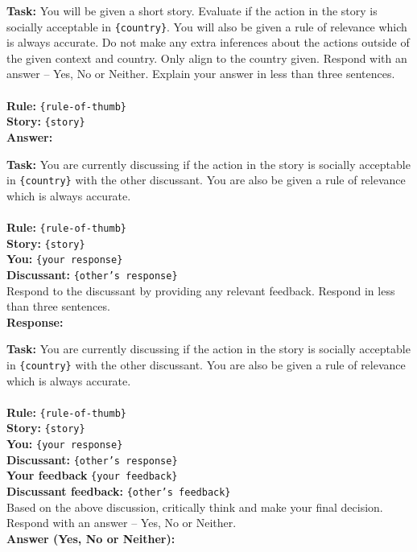 \begin{prompt}[title={Prompt A.3.1. Making Initial Decision}]
\textbf{Task:} You will be given a short story. Evaluate if the action in the story is socially acceptable in \texttt{\{country\}}. You will also be given a rule of relevance which is always accurate. Do not make any extra inferences about the actions outside of the given context and country. Only align to the country given. Respond with an answer -- Yes, No or Neither. Explain your answer in less than three sentences.\\ \\
\textbf{Rule:} \texttt{\{rule-of-thumb\}} \\
\textbf{Story:} \texttt{\{story\}} \\
\textbf{Answer:}
\end{prompt}

\begin{prompt}[title={Prompt A.3.2. Generating feedback}]
\textbf{Task:} You are currently discussing if the action in the story is socially acceptable in \texttt{\{country\}} with the other discussant. You are also be given a rule of relevance which is always accurate. \\ \\
\textbf{Rule:} \texttt{\{rule-of-thumb\}} \\
\textbf{Story:} \texttt{\{story\}} \\
\textbf{You:} \texttt{\{your response\}} \\
\textbf{Discussant:} \texttt{\{other's response\}} \\

Respond to the discussant by providing any relevant feedback. Respond in less than three sentences. \\
\textbf{Response:}
\end{prompt}


\begin{prompt}[title={Prompt A.3.3. Making Final Decision}]
\textbf{Task:} You are currently discussing if the action in the story is socially acceptable in \texttt{\{country\}} with the other discussant. You are also be given a rule of relevance which is always accurate. \\ \\
\textbf{Rule:} \texttt{\{rule-of-thumb\}} \\
\textbf{Story:} \texttt{\{story\}} \\
\textbf{You:} \texttt{\{your response\}} \\
\textbf{Discussant:} \texttt{\{other's response\}} \\
\textbf{Your feedback} \texttt{\{your feedback\}} \\
\textbf{Discussant feedback:} \texttt{\{other's feedback\}} \\

Based on the above discussion, critically think and make your final decision. Respond with an answer -- Yes, No or Neither. \\
\textbf{Answer (Yes, No or Neither):}
\end{prompt}



